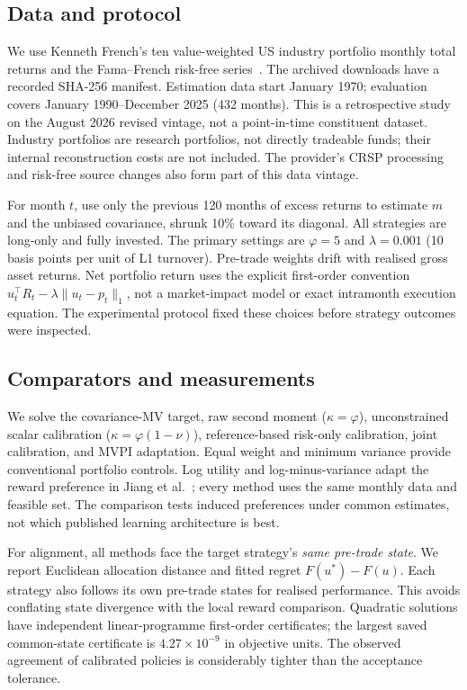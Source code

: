 \documentclass[sigconf,anonymous,review]{acmart}
\begin{document}
\subsection{Data and protocol}
We use Kenneth French's ten value-weighted US industry portfolio monthly total returns and the Fama--French risk-free series\ \cite{french}. The archived downloads have a recorded SHA-256 manifest. Estimation data start January 1970; evaluation covers January 1990--December 2025 (432 months). This is a retrospective study on the August 2026 revised vintage, not a point-in-time constituent dataset. Industry portfolios are research portfolios, not directly tradeable funds; their internal reconstruction costs are not included. The provider's CRSP processing and risk-free source changes also form part of this data vintage.

For month $t$, use only the previous 120 months of excess returns to estimate $m$ and the unbiased covariance, shrunk 10\% toward its diagonal. All strategies are long-only and fully invested. The primary settings are $\varphi=5$ and $\lambda=0.001$ (10 basis points per unit of L1 turnover). Pre-trade weights drift with realised gross asset returns. Net portfolio return uses the explicit first-order convention $u_t^\top R_t-\lambda\|u_t-p_t\|_1$, not a market-impact model or exact intramonth execution equation. The experimental protocol fixed these choices before strategy outcomes were inspected.

\subsection{Comparators and measurements}
We solve the covariance-MV target, raw second moment ($\kappa=\varphi$), unconstrained scalar calibration ($\kappa=\varphi(1-\nu)$), reference-based risk-only calibration, joint calibration, and MVPI adaptation. Equal weight and minimum variance provide conventional portfolio controls. Log utility and log-minus-variance adapt the reward preference in Jiang et al.\ \cite{jiang2025}; every method uses the same monthly data and feasible set. The comparison tests induced preferences under common estimates, not which published learning architecture is best.

For alignment, all methods face the target strategy's \emph{same pre-trade state}. We report Euclidean allocation distance and fitted regret $F(u^*)-F(u)$. Each strategy also follows its own pre-trade states for realised performance. This avoids conflating state divergence with the local reward comparison. Quadratic solutions have independent linear-programme first-order certificates; the largest saved common-state certificate is $4.27\times10^{-9}$ in objective units. The observed agreement of calibrated policies is considerably tighter than the acceptance tolerance.
\end{document}
